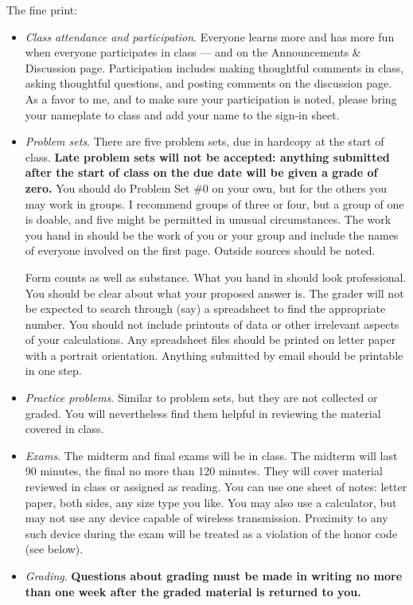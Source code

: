 \documentclass[12pt]{article}
\begin{document}
The fine print:
\begin{itemize}

\item \textit{Class attendance and participation}.
Everyone learns more and has more fun when everyone participates in class ---
and on the Announcements \& Discussion page.
Participation includes making thoughtful comments in class,
asking thoughtful questions,
and posting comments on the discussion page.
As a favor to me, and to make sure your participation is noted,
please bring your nameplate to class and add your name to the
sign-in sheet.

\item \textit{Problem sets}.
There are five problem sets,
due in hardcopy at the start of class.
{\bf Late problem sets will not be accepted:
anything submitted after the start of class on the due date will be given a grade of zero.}
You should do Problem Set \#0 on your own,
but for the others you may work in groups.
I recommend groups of three or four,
but a group of one is doable, and five might be permitted in unusual circumstances.
The work you hand in should be the work of you or your group
and include the names of everyone involved on the first page.
Outside sources should be noted.

Form counts as well as substance.
What you hand in should look professional.
You should be clear about what your proposed answer is.
The grader will not be expected to search through (say) a spreadsheet to find the appropriate number.
You should not include printouts of data or other irrelevant aspects of your calculations.
Any spreadsheet files should be printed on letter paper
with a portrait orientation.
Anything submitted by email should be printable in one step.

\item \textit{Practice problems}.
Similar to problem sets, but they are not collected or graded.
You will nevertheless find them helpful in reviewing the
material covered in class.


\item \textit{Exams}.
The midterm and final exams will be in class.
The midterm will last 90 minutes, the final no more than 120 minutes.
They will cover material reviewed in class or assigned as reading.
You can use one sheet of notes: letter paper, both sides, any size type you like.
You may also use a calculator, but may not use any device
capable of wireless transmission.  Proximity to any such
device during the exam will be treated as a violation of the honor
code (see below).

\item \textit{Grading}.
{\bf Questions about grading must be made in writing no more than one week
after the graded material is returned to you.}


\end{itemize}
\end{document}
